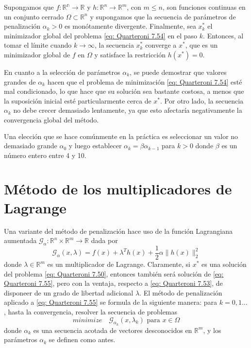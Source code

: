 \begin{property}
    Supongamos que $f: \mathbb{R^n} \rightarrow \mathbb{R}$ y $h: \mathbb{R}^n \rightarrow \mathbb{R}^m$, con $m \leq n$, son funciones continuas en un conjunto cerrado $\Omega \subset \mathbb{R}^n$ y supongamos que la secuencia de parámetros de penalización $\alpha_k > 0$ es monótamente divergente. Finalmente, sea $x_k^*$ el minimizador global del problema \ref{eq: Quarteroni 7.54} en el paso $k$. Entonces, al tomar el límite cuando $k \rightarrow \infty$, la secuencia $x_k^*$ converge a $x^*$, que es un minimizador global de $f$ en $\Omega$ y satisface la restricción $h(x^*) = 0$.
\end{property}

En cuanto a la selección de parámetros $\alpha_k$, se puede demostrar que valores grandes de $\alpha_k$ hacen que el problema de minimización \ref{eq: Quarteroni 7.54} esté mal condicionado, lo que hace que su solución sea bastante costosa, a menos que la suposición inicial esté particularmente cerca de $x^*$. Por otro lado, la secuencia $\alpha_k$ no debe crecer demasiado lentamente, ya que esto afectaría negativamente la convergencia global del método.

Una elección que se hace comúnmente en la práctica es seleccionar un valor no demasiado grande $\alpha_0$ y luego establecer $\alpha_k = \beta \alpha_{k - 1}$ para $k > 0$ donde $\beta$ es un número entero entre 4 y 10.

\section{Método de los multiplicadores de Lagrange}

Una variante del método de penalización hace uso de la función Lagrangiana aumentada $\mathcal{G}_\alpha : \mathbb{R}^n \times \mathbb{R}^m \rightarrow \mathbb{R}$ dada por
\begin{equation}
    \label{eq: Quarteroni 7.55}
    \mathcal{G}_\alpha (x, \lambda) = f(x) + \lambda^T h(x) + \frac{1}{2} \alpha \| h(x) \|_2^2
\end{equation}
donde $\lambda \in \mathbb{R}^m$ es un multiplicador de Lagrange. Claramente, si $x^*$ es una solución del problema \ref{eq: Quarteroni 7.50}, entonces también será solución de \ref{eq: Quarteroni 7.55}, pero con la ventaja, respecto a \ref{eq: Quarteroni 7.53}, de disponeer de un grado de libertad adicional $\lambda$. El método de penalización aplicado a \ref{eq: Quarteroni 7.55} se formula de la siguiente manera: para $k = 0,1...$, hasta la convergencia, resolver la secuencia de problemas
\begin{equation}
    \label{eq: Quarteroni 7.56}
    minimize \quad \mathcal{G}_{\alpha_k} (x, \lambda_k) \text{ para } x \in \Omega
\end{equation}
donde ${\alpha_k}$ es una secuencia acotada de vectores desconocidos en $\mathbb{R}^m$, y los parámetros $\alpha_k$ se definen como antes.

